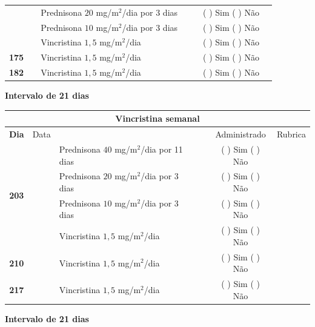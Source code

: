\documentclass[11pt,a4paper,oldfontcommands]{memoir}
\begin{document}
\begin{center}
\begin{table}[H]
\begin{tabular}{p{1cm}c|p{5cm}|p{1cm}p{2cm}|c|c}
    \multicolumn{1}{c|}{}&&{Prednisona \(20\) mg/m\(^2\)/dia por 3 dias}&\multicolumn{1}{c}{}&&{(  ) Sim (  ) Não}&\\
    \multicolumn{1}{c|}{}&&{Prednisona \(10\) mg/m\(^2\)/dia por 3 dias}&\multicolumn{1}{c}{}&&{(  ) Sim (  ) Não}&\\
    \multicolumn{1}{c|}{\textbf{}}&&{Vincristina \(1,5\) mg/m\(^2\)/dia}&\multicolumn{1}{c}{}&&{(  ) Sim (  ) Não}&\\
    \cline{1-6}
    \multicolumn{1}{c|}{\textbf{175}}&&{Vincristina \(1,5\) mg/m\(^2\)/dia}&\multicolumn{1}{c}{}&&{(  ) Sim (  ) Não}&\\
    \cline{1-3}\cline{6-6}
    \multicolumn{1}{c|}{\textbf{182}}&&{Vincristina \(1,5\) mg/m\(^2\)/dia}&\multicolumn{1}{c}{}&&{(  ) Sim (  ) Não}&\\
    \hline
\end{tabular}
\end{table}
\textbf{Intervalo de 21 dias}
\begin{table}[H] \small
\begin{tabular}{p{1cm}c|p{5cm}|p{1cm}p{2cm}|c|c}
	\hline
	\multicolumn{7}{c}{Vincristina semanal} \\
	\hline
	\multicolumn{1}{c|}{\multirow{1}{*}{\textbf{Dia}}}&{Data}&{}&{}&&{Administrado}&{Rubrica} \\
    \hline
    \multicolumn{1}{c|}{\multirow{4}{*}{\textbf{203}}}&&{Prednisona \(40\) mg/m\(^2\)/dia por 11 dias}&\multicolumn{1}{c}{}&&{(  ) Sim (  ) Não}&\\
    \multicolumn{1}{c|}{}&&{Prednisona \(20\) mg/m\(^2\)/dia por 3 dias}&\multicolumn{1}{c}{}&&{(  ) Sim (  ) Não}&\\
    \multicolumn{1}{c|}{}&&{Prednisona \(10\) mg/m\(^2\)/dia por 3 dias}&\multicolumn{1}{c}{}&&{(  ) Sim (  ) Não}&\\
    \multicolumn{1}{c|}{\textbf{}}&&{Vincristina \(1,5\) mg/m\(^2\)/dia}&\multicolumn{1}{c}{}&&{(  ) Sim (  ) Não}&\\
    \cline{1-6}
    \multicolumn{1}{c|}{\textbf{210}}&&{Vincristina \(1,5\) mg/m\(^2\)/dia}&\multicolumn{1}{c}{}&&{(  ) Sim (  ) Não}&\\
    \cline{1-3}\cline{6-6}
    \multicolumn{1}{c|}{\textbf{217}}&&{Vincristina \(1,5\) mg/m\(^2\)/dia}&\multicolumn{1}{c}{}&&{(  ) Sim (  ) Não}&\\
    \hline
\end{tabular}
\end{table}
\textbf{Intervalo de 21 dias}
\begin{table}[H] \small

\end{table}
\end{center}
\end{document}
